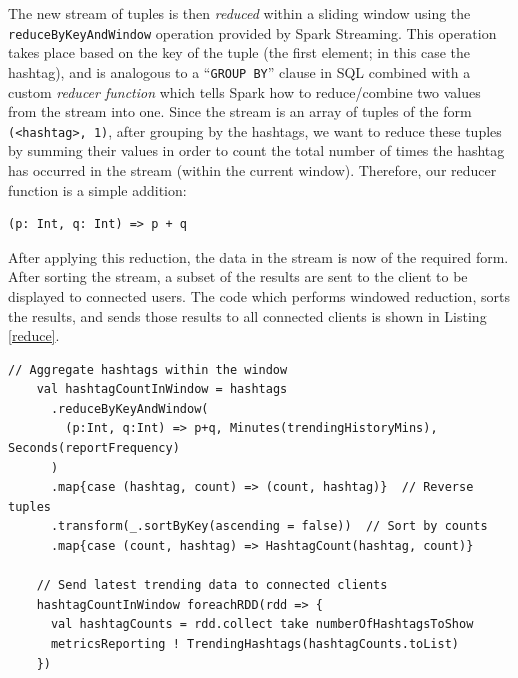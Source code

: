 \documentclass{l4proj}
\newcommand{\code}[1]{\texttt{#1}}
\begin{document}
The new stream of tuples is then \textit{reduced} within a sliding window using the \code{reduceByKeyAndWindow} operation provided by Spark Streaming. This operation takes place based on the key of the tuple (the first element; in this case the hashtag), and is analogous to a ``\code{GROUP BY}'' clause in SQL combined with a custom \textit{reducer function} which tells Spark how to reduce/combine two values from the stream into one. Since the stream is an array of tuples of the form \code{(<hashtag>, 1)}, after grouping by the hashtags, we want to reduce these tuples by summing their values in order to count the total number of times the hashtag has occurred in the stream (within the current window). Therefore, our reducer function is a simple addition:

\begin{lstlisting}
(p: Int, q: Int) => p + q
\end{lstlisting}

After applying this reduction, the data in the stream is now of the required form. After sorting the stream, a subset of the results are sent to the client to be displayed to connected users. The code which performs windowed reduction, sorts the results, and sends those results to all connected clients is shown in Listing \ref{reduce}.

\begin{lstlisting}[caption=Counting the hashtags used within a temporal window.,label=reduce]
    // Aggregate hashtags within the window
    val hashtagCountInWindow = hashtags
      .reduceByKeyAndWindow(
        (p:Int, q:Int) => p+q, Minutes(trendingHistoryMins), Seconds(reportFrequency)
      )
      .map{case (hashtag, count) => (count, hashtag)}  // Reverse tuples
      .transform(_.sortByKey(ascending = false))  // Sort by counts
      .map{case (count, hashtag) => HashtagCount(hashtag, count)}

    // Send latest trending data to connected clients
    hashtagCountInWindow foreachRDD(rdd => {
      val hashtagCounts = rdd.collect take numberOfHashtagsToShow
      metricsReporting ! TrendingHashtags(hashtagCounts.toList)
    })

\end{lstlisting}
\end{document}
